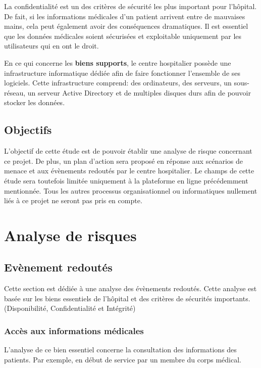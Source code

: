 \documentclass[12pt]{article}
\begin{document}
\justify
La confidentialité est un des critères de sécurité les plus important pour l'hôpital. De fait, si les informations médicales d'un patient arrivent entre de mauvaises mains, cela peut également avoir des conséquences dramatiques. Il est essentiel que les données médicales soient sécurisées et exploitable uniquement par les utilisateurs qui en ont le droit.

\justify
En ce qui concerne les \textbf{biens supports}, le centre hospitalier possède une infrastructure informatique dédiée afin de faire fonctionner l'ensemble de ses logiciels. Cette infrastructure comprend: des ordinateurs, des serveurs, un sous-réseau, un serveur Active Directory et de multiples disques durs afin de pouvoir stocker les données.

\subsection{Objectifs}

\justify
L'objectif de cette étude est de pouvoir établir une analyse de risque concernant ce projet. De plus, un plan d'action sera proposé en réponse aux scénarios de menace et aux évènements redoutés par le centre hospitalier. Le champs de cette étude sera toutefois limitée uniquement à la plateforme en ligne précédemment mentionnée. Tous les autres processus organisationnel ou informatiques nullement liés à ce projet ne seront pas pris en compte.

\section{Analyse de risques}

\subsection{Evènement redoutés}

Cette section est dédiée à une analyse des évènements redoutés. Cette analyse est basée sur les biens essentiels de l'hôpital et des critères de sécurités importants. (Disponibilité, Confidentialité et Intégrité)

\subsubsection{Accès aux informations médicales}

L'analyse de ce bien essentiel concerne la consultation des informations des patients. Par exemple, en début de service par un membre du corps médical.
\end{document}
